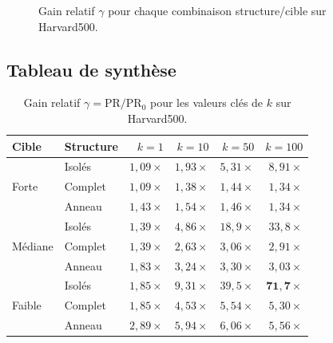 \documentclass[12pt,a4paper]{article}
\newcommand{\PR}{\mathrm{PR}}
\theoremstyle{definition}
\begin{document}
\begin{figure}[H]
\caption{Gain relatif $\gamma$ pour chaque combinaison structure/cible sur
Harvard500.}
\label{fig:gains}
\end{figure}

\subsection{Tableau de synthèse}

\begin{table}[H]
\centering
\caption{Gain relatif $\gamma=\PR/\PR_0$ pour les valeurs clés de $k$ sur Harvard500.}
\label{tab:synthese-harvard}
\small
\begin{tabular}{llrrrr}
\toprule
\textbf{Cible} & \textbf{Structure} & $k=1$ & $k=10$ & $k=50$ & $k=100$ \\
\midrule
\multirow{3}{*}{Forte}
 & Isolés  & $1{,}09\times$ & $1{,}93\times$ & $5{,}31\times$ & $8{,}91\times$ \\
 & Complet & $1{,}09\times$ & $1{,}38\times$ & $1{,}44\times$ & $1{,}34\times$ \\
 & Anneau  & $1{,}43\times$ & $1{,}54\times$ & $1{,}46\times$ & $1{,}34\times$ \\
\midrule
\multirow{3}{*}{Médiane}
 & Isolés  & $1{,}39\times$ & $4{,}86\times$ & $18{,}9\times$ & $33{,}8\times$ \\
 & Complet & $1{,}39\times$ & $2{,}63\times$ & $3{,}06\times$ & $2{,}91\times$ \\
 & Anneau  & $1{,}83\times$ & $3{,}24\times$ & $3{,}30\times$ & $3{,}03\times$ \\
\midrule
\multirow{3}{*}{Faible}
 & Isolés  & $1{,}85\times$ & $9{,}31\times$ & $39{,}5\times$ & $\mathbf{71{,}7}\times$ \\
 & Complet & $1{,}85\times$ & $4{,}53\times$ & $5{,}54\times$ & $5{,}30\times$ \\
 & Anneau  & $2{,}89\times$ & $5{,}94\times$ & $6{,}06\times$ & $5{,}56\times$ \\
\bottomrule
\end{tabular}
\end{table}
\end{document}
